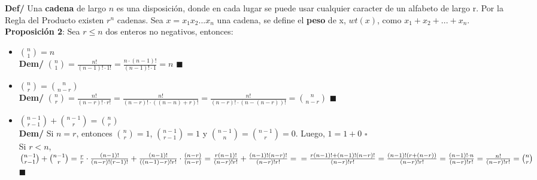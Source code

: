 \documentclass[11pt,a4paper]{article}
\newcommand*{\QEDA}{\null\nobreak\hfill\ensuremath{\blacksquare}}
\newcommand*{\QEDB}{\null\nobreak\hfill\ensuremath{\square}}
\begin{document}
\textbf{Def/} Una \textbf{cadena} de largo $n$ es una disposici\'on, donde en cada lugar se puede usar cualquier caracter de un alfabeto de largo r. Por la Regla del Producto existen $r^n$ cadenas. Sea $x=x_1x_2...x_n$ una cadena, se define el \textbf{peso} de x, $wt(x)$, como $x_1+x_2+...+x_n$.\\

\textbf{Proposici\'on 2}: Sea $r \leq n$ dos enteros no negativos, entonces:
\begin{itemize}
\item {\Large ${n \choose 1} = n$}\\
\textbf{Dem/} ${n \choose 1} = \frac{n!}{(n-1)!\cdot1!} = \frac{n \cdot (n-1)!}{(n-1)!\cdot 1} = n$ \QEDA
\item {\Large ${n \choose r} = {n \choose n-r}$}\\
\textbf{Dem/} ${n \choose r} = \frac{n!}{(n-r)!\cdot r!} = \frac{n!}{(n-r)!\cdot ((n-n)+r)!} = \frac{n!}{(n-r)!\cdot (n-(n-r))!} = {n \choose n-r} $ \QEDA
\item {\Large ${n-1 \choose r-1} + {n-1 \choose r} = {n \choose r}$}\\
\textbf{Dem/} Si $n=r$, entonces ${n \choose r}=1$, ${n-1 \choose r-1} = 1$ y ${n-1 \choose n} = {n-1 \choose r} = 0$. Luego, $1 = 1 + 0$ \QEDB\\
Si $r < n$, ${n-1 \choose r-1} + {n-1 \choose r} = \frac{r}{r} \cdot \frac{(n-1)!}{(n-r)!(r-1)!} + \frac{(n-1)!}{((n-1)-r)!r!} \cdot \frac{(n-r)}{(n-r)} = \frac{r(n-1)!}{(n-r)!r!} + \frac{(n-1)!(n-r)!}{(n-r)!r!} = \\ = \frac{r(n-1)!+(n-1)!(n-r)!}{(n-r)!r!} = \frac{(n-1)!(r+(n-r))}{(n-r)!r!} = \frac{(n-1)! \cdot n}{(n-r)!r!} = \frac{n!}{(n-r)!r!} = {n \choose r}$ \QEDA\\
\end{itemize}
\end{document}
